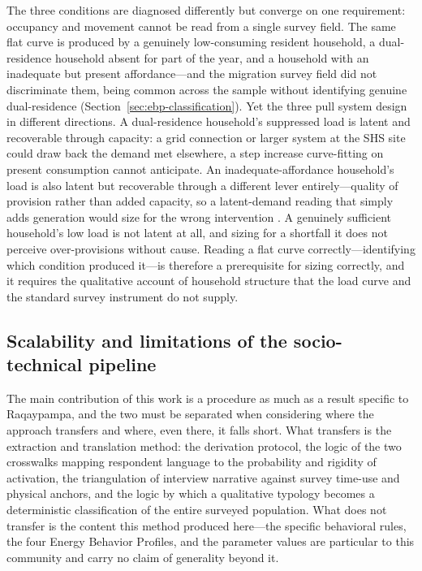 \documentclass[final,3p,times,onecolumn]{elsarticle}
\begin{document}
The three conditions are diagnosed differently but converge on one requirement: occupancy and movement cannot be read from a single survey field. The same flat curve is produced by a genuinely low-consuming resident household, a dual-residence household absent for part of the year, and a household with an inadequate but present affordance---and the migration survey field did not discriminate them, being common across the sample without identifying genuine dual-residence (Section~\ref{sec:ebp-classification}). Yet the three pull system design in different directions. A dual-residence household's suppressed load is latent and recoverable through capacity: a grid connection or larger system at the SHS site could draw back the demand met elsewhere, a step increase curve-fitting on present consumption cannot anticipate. An inadequate-affordance household's load is also latent but recoverable through a different lever entirely---quality of provision rather than added capacity, so a latent-demand reading that simply adds generation would size for the wrong intervention \citep{azimoh_illuminated_2015}. A genuinely sufficient household's low load is not latent at all, and sizing for a shortfall it does not perceive over-provisions without cause. Reading a flat curve correctly---identifying which condition produced it---is therefore a prerequisite for sizing correctly, and it requires the qualitative account of household structure that the load curve and the standard survey instrument do not supply.

\subsection{Scalability and limitations of the socio-technical pipeline}
\label{sec:scalability}

The main contribution of this work is a procedure as much as a result specific to Raqaypampa, and the two must be separated when considering where the approach transfers and where, even there, it falls short. What transfers is the extraction and translation method: the derivation protocol, the logic of the two crosswalks mapping respondent language to the probability and rigidity of activation, the triangulation of interview narrative against survey time-use and physical anchors, and the logic by which a qualitative typology becomes a deterministic classification of the entire surveyed population. What does not transfer is the content this method produced here---the specific behavioral rules, the four Energy Behavior Profiles, and the parameter values are particular to this community and carry no claim of generality beyond it.
\end{document}
